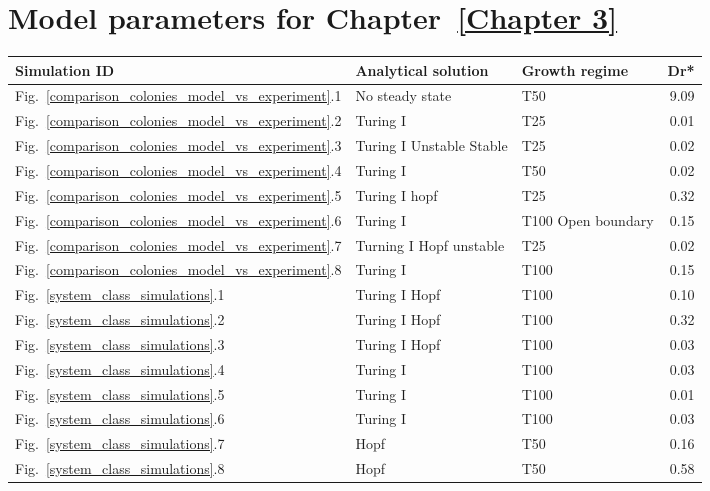 \chapter{Model parameters for Chapter~\ref{Chapter 3}}
\begin{table}
    \centering
    \begin{adjustbox}{center}
        \begin{tabular}{lllr}
            \toprule
            \textbf{Simulation ID} & \textbf{Analytical solution} & \textbf{Growth regime} & \textbf{Dr*} \\
            \midrule
             Fig.~\ref{comparison_colonies_model_vs_experiment}.1 & No steady state & T50 & 9.09 \\
             Fig.~\ref{comparison_colonies_model_vs_experiment}.2 & Turing I & T25 & 0.01 \\
             Fig.~\ref{comparison_colonies_model_vs_experiment}.3 & Turing I Unstable Stable & T25 & 0.02 \\
             Fig.~\ref{comparison_colonies_model_vs_experiment}.4 & Turing I & T50 & 0.02 \\
             Fig.~\ref{comparison_colonies_model_vs_experiment}.5 & Turing I hopf & T25 & 0.32 \\
             Fig.~\ref{comparison_colonies_model_vs_experiment}.6 & Turing I & T100 Open boundary & 0.15 \\
             Fig.~\ref{comparison_colonies_model_vs_experiment}.7 & Turning I Hopf unstable & T25 & 0.02 \\
             Fig.~\ref{comparison_colonies_model_vs_experiment}.8 & Turing I & T100 & 0.15 \\
             Fig.~\ref{system_class_simulations}.1 & Turing I Hopf & T100 & 0.10 \\
             Fig.~\ref{system_class_simulations}.2 & Turing I Hopf & T100 & 0.32 \\
             Fig.~\ref{system_class_simulations}.3 & Turing I Hopf & T100 & 0.03 \\
             Fig.~\ref{system_class_simulations}.4 & Turing I & T100 & 0.03 \\
             Fig.~\ref{system_class_simulations}.5 & Turing I & T100 & 0.01 \\
             Fig.~\ref{system_class_simulations}.6 & Turing I & T100 & 0.03 \\
             Fig.~\ref{system_class_simulations}.7 & Hopf & T50 & 0.16 \\
             Fig.~\ref{system_class_simulations}.8 & Hopf & T50 & 0.58 \\

\end{tabular}
\end{adjustbox}
\end{table}
